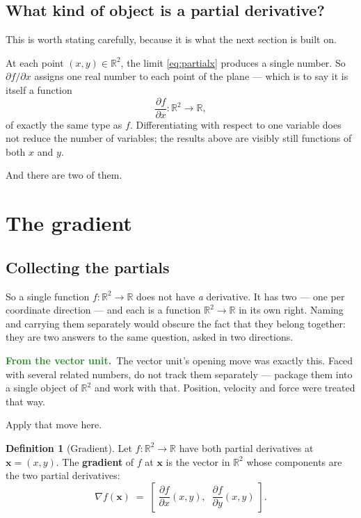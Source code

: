 \documentclass[11pt]{article}
\theoremstyle{plain}
\theoremstyle{definition}
\newtheorem{defn}{Definition}[section]
\theoremstyle{remark}
\newcommand{\lookback}{\par\smallskip\noindent
  \textbf{\sffamily\textcolor{ForestGreen}{From the vector unit.}}\ \ignorespaces}
\newcommand{\R}{\mathbb{R}}
\newcommand{\vc}[1]{\mathbf{#1}}
\newcommand{\grad}{\nabla}
\newcommand{\pd}[2]{\frac{\partial #1}{\partial #2}}
\begin{document}
\subsection{What kind of object is a partial derivative?}
This is worth stating carefully, because it is what the next section is built
on.

At each point $(x,y)\in\R^{2}$, the limit \eqref{eq:partialx} produces a single
number. So $\partial f/\partial x$ assigns one real number to each point of the
plane --- which is to say it is itself a function
\[
  \pd{f}{x}:\R^{2}\longrightarrow\R ,
\]
of exactly the same type as $f$. Differentiating with respect to one variable
does not reduce the number of variables; the results above are visibly still
functions of both $x$ and $y$.

And there are two of them.

\section{The gradient}

\subsection{Collecting the partials}
So a single function $f:\R^{2}\to\R$ does not have \emph{a} derivative. It has
two --- one per coordinate direction --- and each is a function $\R^{2}\to\R$ in
its own right. Naming and carrying them separately would obscure the fact that
they belong together: they are two answers to the same question, asked in two
directions.

\lookback The vector unit's opening move was exactly this. Faced with several
related numbers, do not track them separately --- package them into a single
object of $\R^{2}$ and work with that. Position, velocity and force were treated
that way.

Apply that move here.

\begin{defn}[Gradient]
Let $f:\R^{2}\to\R$ have both partial derivatives at $\vc{x}=(x,y)$. The
\textbf{gradient} of $f$ at $\vc{x}$ is the vector in $\R^{2}$ whose components
are the two partial derivatives:
\[
  \grad f(\vc{x})
  \;=\;
  \left[\;\pd{f}{x}(x,y),\;\;\pd{f}{y}(x,y)\;\right] .
\]
\end{defn}
\end{document}
